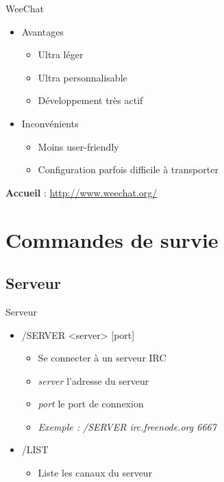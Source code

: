 \documentclass{beamer}
\begin{document}
\begin{frame}{WeeChat}
\begin{itemize}	
	\itemsep1.3em
		\item Avantages
		\begin{itemize}
			\item Ultra léger
			\item Ultra personnalisable
			\item Développement très actif
		\end{itemize}
		\item Inconvénients
		\begin{itemize}
			\item Moins user-friendly
			\item Configuration parfois difficile à transporter
		\end{itemize}
\end{itemize}
\begin{center}
	\textbf{Accueil} : \url{http://www.weechat.org/}
\end{center}
\end{frame}

\section{Commandes de survie}

	\subsection{Serveur} %
\begin{frame}{Serveur}
\begin{itemize}	
	\itemsep1.3em
		\item /SERVER <server> [port]
		\begin{itemize}
			\item Se connecter à un serveur IRC
			\item \textit{server} l'adresse du serveur
			\item \textit{port} le port de connexion
			\item \textit{Exemple : /SERVER irc.freenode.org 6667}
		\end{itemize}
		\item /LIST
		\begin{itemize}
			\item Liste les canaux du serveur
		\end{itemize}
\end{itemize}
\end{frame}
	
\end{document}
